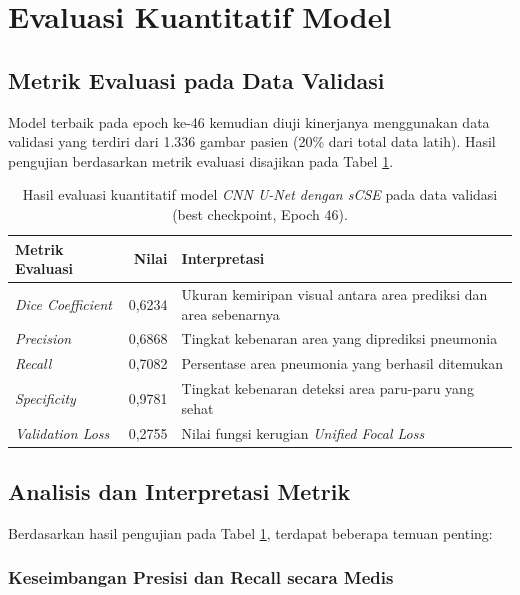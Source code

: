 \documentclass[12pt,a4paper,oneside]{book}
\begin{document}
\section{Evaluasi Kuantitatif Model}

\subsection{Metrik Evaluasi pada Data Validasi}

Model terbaik pada epoch ke-46 kemudian diuji kinerjanya menggunakan data validasi yang terdiri dari 1.336 gambar pasien (20\% dari total data latih). Hasil pengujian berdasarkan metrik evaluasi disajikan pada Tabel \ref{tab:eval_results}.

\begin{table}[htbp]
  \centering
  \caption{Hasil evaluasi kuantitatif model \textit{CNN U-Net dengan sCSE} pada data validasi (best checkpoint, Epoch 46).}
  \label{tab:eval_results}
  \begin{tabularx}{\textwidth}{lrX}
    \toprule
    \textbf{Metrik Evaluasi} & \textbf{Nilai} & \textbf{Interpretasi} \\
    \midrule
    \textit{Dice Coefficient}  & 0,6234 & Ukuran kemiripan visual antara area prediksi dan area sebenarnya \\
    \textit{Precision}           & 0,6868 & Tingkat kebenaran area yang diprediksi pneumonia \\
    \textit{Recall}              & 0,7082 & Persentase area pneumonia yang berhasil ditemukan \\
    \textit{Specificity}         & 0,9781 & Tingkat kebenaran deteksi area paru-paru yang sehat \\
    \midrule
    \textit{Validation Loss}     & 0,2755 & Nilai fungsi kerugian \textit{Unified Focal Loss} \\
    \bottomrule
  \end{tabularx}
\end{table}

\subsection{Analisis dan Interpretasi Metrik}

Berdasarkan hasil pengujian pada Tabel \ref{tab:eval_results}, terdapat beberapa temuan penting:

\subsubsection{Keseimbangan Presisi dan Recall secara Medis}
\end{document}

